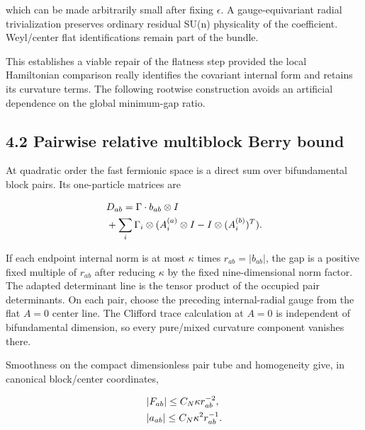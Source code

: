which can be made arbitrarily small after fixing \(\epsilon\). A
gauge-equivariant radial trivialization preserves ordinary residual
SU(n) physicality of the coefficient. Weyl/center flat identifications
remain part of the bundle.

This establishes a viable repair of the flatness step provided the local
Hamiltonian comparison really identifies the covariant internal form and
retains its curvature terms. The following rootwise construction avoids
an artificial dependence on the global minimum-gap ratio.

\subsection{4.2 Pairwise relative multiblock Berry
bound}\label{f-pairwise-relative-multiblock-berry-bound}

At quadratic order the fast fermionic space is a direct sum over
bifundamental block pairs. Its one-particle matrices are

\begin{gather*}
\begin{aligned}
& D_{ab}=\Gamma  \cdot  b_{ab} \otimes  I \\
& +\sum _{i} \Gamma _{i} \otimes  (A_{i}^{(a)} \otimes  I-I \otimes  (A_{i}^{(b)})^{T}).
\end{aligned}\notag
\end{gather*}

If each endpoint internal norm is at most \(\kappa\) times
\(r_{ab}=\vert b_{ab}\vert\), the gap is a positive fixed multiple of
\(r_{ab}\) after reducing \(\kappa\) by the fixed nine-dimensional norm
factor. The adapted determinant line is the tensor product of the
occupied pair determinants. On each pair, choose the preceding
internal-radial gauge from the flat \(A=0\) center line. The Clifford
trace calculation at \(A=0\) is independent of bifundamental dimension,
so every pure/mixed curvature component vanishes there.

Smoothness on the compact dimensionless pair tube and homogeneity give,
in canonical block/center coordinates,

\begin{gather*}
\begin{aligned}
& \vert F_{ab}\vert \le C_{N} \kappa  r_{ab}^{-2}, \\
& \vert a_{ab}\vert \le C_{N} \kappa ^{2} r_{ab}^{-1}.
\end{aligned}\notag
\end{gather*}

